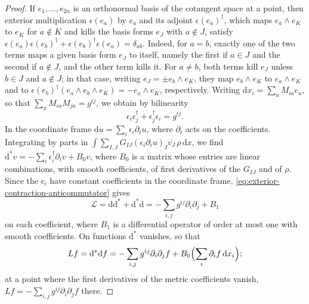 \begin{proof}
If $e_1,\ldots,e_{2n}$ is an orthonormal basis of the cotangent space at a point, then exterior multiplication $\epsilon(e_a)$ by $e_a$ and its adjoint $\epsilon(e_a)^\dagger$, which maps $e_a\wedge e_K$ to $e_K$ for $a\notin K$ and kills the basis forms $e_J$ with $a\notin J$, satisfy $\epsilon(e_a)\epsilon(e_b)^\dagger+\epsilon(e_b)^\dagger\epsilon(e_a)=\delta_{ab}$. Indeed, for $a=b$, exactly one of the two terms maps a given basis form $e_J$ to itself, namely the first if $a\in J$ and the second if $a\notin J$, and the other term kills it. For $a\neq b$, both terms kill $e_J$ unless $b\in J$ and $a\notin J$; in that case, writing $e_J=\pm e_b\wedge e_K$, they map $e_b\wedge e_K$ to $e_a\wedge e_K$ and to $\epsilon(e_b)^\dagger(e_a\wedge e_b\wedge e_K)=-e_a\wedge e_K$, respectively. Writing $\mathrm dx_i=\sum_aM_{ia}e_a$, so that $\sum_aM_{ia}M_{ja}=g^{ij}$, we obtain by bilinearity
\begin{equation}\label{eq:exterior-contraction-anticommutator}
 \epsilon_i\epsilon_j^\dagger+\epsilon_j^\dagger\epsilon_i=g^{ij}.
\end{equation}
In the coordinate frame $\mathrm du=\sum_i\epsilon_i\partial_iu$, where $\partial_i$ acts on the coefficients. Integrating by parts in $\int\sum_{I,J}G_{IJ}(\epsilon_i\partial_iu)_I\overline{v_J}\,\rho\,\mathrm dx$, we find $\mathrm d^*v=-\sum_i\epsilon_i^\dagger\partial_iv+B_0v$, where $B_0$ is a matrix whose entries are linear combinations, with smooth coefficients, of first derivatives of the $G_{IJ}$ and of $\rho$. Since the $\epsilon_i$ have constant coefficients in the coordinate frame, \eqref{eq:exterior-contraction-anticommutator} gives
\[
 \mathcal L=\mathrm d\mathrm d^*+\mathrm d^*\mathrm d=-\sum_{i,j}g^{ij}\partial_i\partial_j+B_1
\]
on each coefficient, where $B_1$ is a differential operator of order at most one with smooth coefficients. On functions $\mathrm d^*$ vanishes, so that
\begin{equation}\label{eq:laplace-beltrami-local}
 Lf=\mathrm d^*\mathrm df=-\sum_{i,j}g^{ij}\partial_i\partial_jf+B_0\Bigl(\sum_i\partial_if\,\mathrm dx_i\Bigr);
\end{equation}
at a point where the first derivatives of the metric coefficients vanish, $Lf=-\sum_{i,j}g^{ij}\partial_i\partial_jf$ there.


\end{proof}
